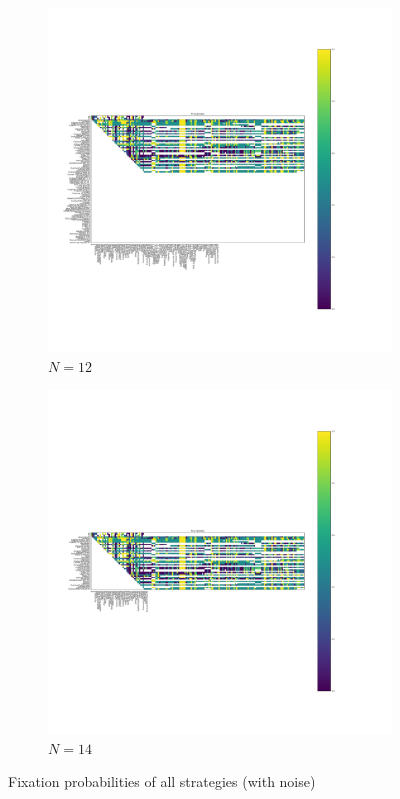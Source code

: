 \documentclass{article}
\begin{document}
\begin{figure}[!hbtp]
\begin{subfigure}[t]{.3\textwidth}
        \centering
        \includegraphics[width=.8\textwidth]{../img/fixation_heatmap_12_noise.pdf}
        \caption{\(N=12\)}
    \end{subfigure}%

    \begin{subfigure}[t]{.3\textwidth}
        \centering
        \includegraphics[width=.8\textwidth]{../img/fixation_heatmap_14_noise.pdf}
        \caption{\(N=14\)}
    \end{subfigure}%
    \caption{Fixation probabilities of all strategies (with noise)}
    \label{fig:fixation_heatmap_std}
\end{figure}
\end{document}
